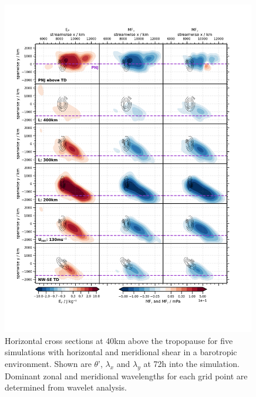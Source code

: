 \begin{figure}[tbp]
    \centering
    \includegraphics[width=0.99\textwidth]{figures_3D/waveletAna_fluxes_sim.png}
    \caption{Horizontal cross sections at 40km above the tropopause for five simulations with horizontal and meridional shear in a barotropic environment. Shown are $\theta$', $\lambda_x$ and $\lambda_y$ at 72h into the simulation. Dominant zonal and meridional wavelengths for each grid point are determined from wavelet analysis.}
\end{figure}